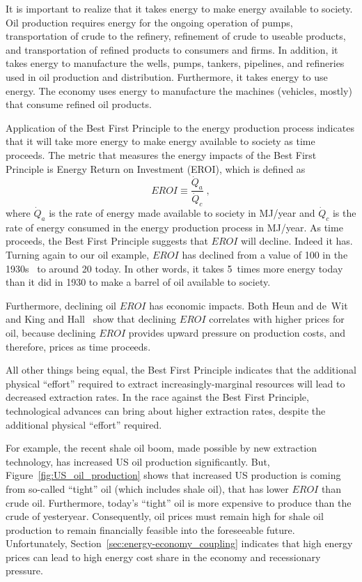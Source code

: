 It is important to realize that it takes energy to make energy available to society.
Oil production requires energy for the ongoing
operation of pumps, 
transportation of crude to the refinery,
refinement of crude to useable products, and 
transportation of refined products to consumers and firms.
In addition, it takes energy to manufacture the wells, pumps, 
tankers, pipelines, and
refineries used in oil production and distribution.
Furthermore, it takes energy to use energy. 
The economy uses energy to manufacture the machines (vehicles, mostly)
that consume refined oil products.

Application of the Best First Principle to the energy production process 
indicates that it will take more energy 
to make energy available to society as time proceeds.
The metric that measures the energy impacts of the Best First Principle is 
Energy Return on Investment (EROI), which is defined as 
%
\begin{equation}
	EROI \equiv \frac{\dot{Q}_a}{\dot{Q}_c} \; ,
\end{equation}
%
where $\dot{Q}_a$ is the rate of energy made available to society in MJ/year
and $\dot{Q}_c$ is the rate of energy consumed in the energy production process in MJ/year.
As time proceeds, the Best First Principle suggests that
$EROI$ will decline.
Indeed it has.
Turning again to our oil example, $EROI$ has declined 
from a value of 100 in the 1930s~\cite[p.~781]{Cleveland:2005uy} 
to around 20 today.\cite[Fig.~2]{Hall:2014aa}
In other words, it takes 5~times more energy today
than it did in 1930
to make a barrel of oil available to society.

Furthermore, declining oil $EROI$ has economic impacts.
Both Heun and de~Wit~\cite{Heun:2012ek} and King and Hall~\cite{King:2011go}
show that declining $EROI$ correlates with higher prices for oil, 
because declining $EROI$ provides upward pressure on 
production costs, and therefore, prices
as time proceeds.

All other things being equal, the Best First Principle
indicates that the additional physical ``effort'' required to extract
increasingly-marginal resources will lead to decreased extraction rates.
In the race against the Best First Principle,
technological advances can bring about higher extraction rates, 
despite the additional physical ``effort'' required.

For example, the recent shale oil boom, made possible by new extraction technology,
has increased US oil production significantly. 
But, Figure~\ref{fig:US_oil_production} shows that increased US production
is coming from so-called ``tight'' oil (which includes shale oil), 
that has lower $EROI$ than crude oil.
Furthermore, today's ``tight'' oil is more expensive to produce 
than the crude of yesteryear.
Consequently, oil prices must remain high for 
shale oil production to remain financially feasible into the foreseeable future. 
Unfortunately, Section~\ref{sec:energy-economy_coupling} indicates that
high energy prices can lead to high energy cost share in the economy
and recessionary pressure.

